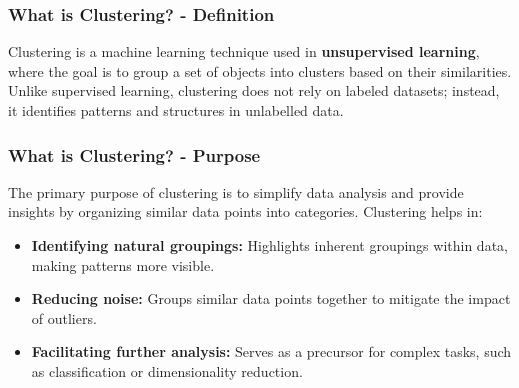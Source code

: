 \documentclass[aspectratio=169]{beamer}
\begin{document}
\begin{frame}[fragile]
    \frametitle{What is Clustering? - Definition}
    Clustering is a machine learning technique used in \textbf{unsupervised learning}, where the goal is to group a set of objects into clusters based on their similarities. Unlike supervised learning, clustering does not rely on labeled datasets; instead, it identifies patterns and structures in unlabelled data.
\end{frame}

\begin{frame}[fragile]
    \frametitle{What is Clustering? - Purpose}
    The primary purpose of clustering is to simplify data analysis and provide insights by organizing similar data points into categories. Clustering helps in:
    \begin{itemize}
        \item \textbf{Identifying natural groupings:} Highlights inherent groupings within data, making patterns more visible.
        \item \textbf{Reducing noise:} Groups similar data points together to mitigate the impact of outliers.
        \item \textbf{Facilitating further analysis:} Serves as a precursor for complex tasks, such as classification or dimensionality reduction.
    \end{itemize}
\end{frame}
\end{document}
